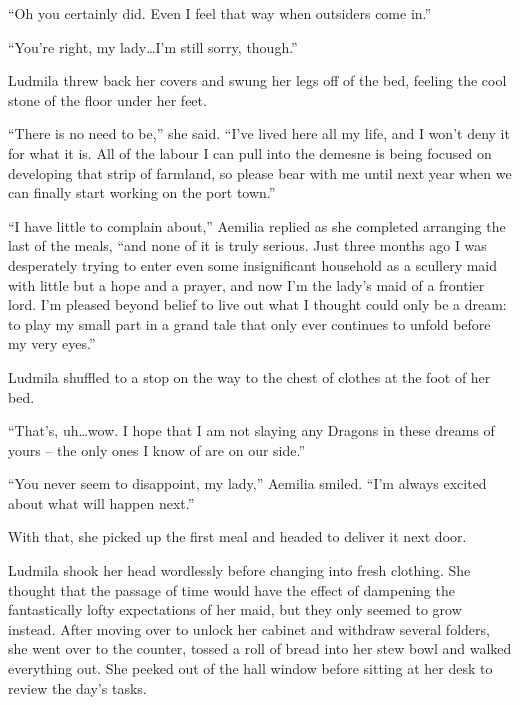  

“Oh you certainly did. Even I feel that way when outsiders come in.”

 

“You’re right, my lady…I’m still sorry, though.”

 

Ludmila threw back her covers and swung her legs off of the bed, feeling the cool stone of the floor under her feet.

 

“There is no need to be,” she said. “I’ve lived here all my life, and I won’t deny it for what it is. All of the labour I can pull into the demesne is being focused on developing that strip of farmland, so please bear with me until next year when we can finally start working on the port town.”

 

“I have little to complain about,” Aemilia replied as she completed arranging the last of the meals, “and none of it is truly serious. Just three months ago I was desperately trying to enter even some insignificant household as a scullery maid with little but a hope and a prayer, and now I’m the lady’s maid of a frontier lord. I’m pleased beyond belief to live out what I thought could only be a dream: to play my small part in a grand tale that only ever continues to unfold before my very eyes.”

 

Ludmila shuffled to a stop on the way to the chest of clothes at the foot of her bed.

 

“That’s, uh…wow. I hope that I am not slaying any Dragons in these dreams of yours – the only ones I know of are on our side.”

 

“You never seem to disappoint, my lady,” Aemilia smiled. “I’m always excited about what will happen next.”

 

With that, she picked up the first meal and headed to deliver it next door.

 

Ludmila shook her head wordlessly before changing into fresh clothing. She thought that the passage of time would have the effect of dampening the fantastically lofty expectations of her maid, but they only seemed to grow instead. After moving over to unlock her cabinet and withdraw several folders, she went over to the counter, tossed a roll of bread into her stew bowl and walked everything out. She peeked out of the hall window before sitting at her desk to review the day’s tasks.

